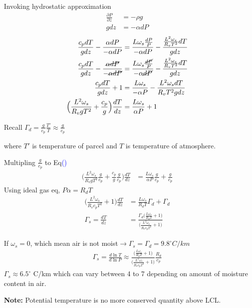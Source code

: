 \documentclass[fleqn,10pt]{SelfArx} %
\newcommand{\myeqref}[1]{\textcolor{blue}{\textup{(\getrefnumber{#1})}}}
\begin{document}
Invoking hydrostatic approximation
\begin{align}
    \frac{\partial P}{\partial z} &= -\rho g \\
    gdz &= -\alpha dP
\end{align}
\begin{align}
    \frac{c_pdT}{gdz} - \frac{\alpha dP}{-\alpha dP} &= \frac{L\omega_s \frac{dP}{P}}{-\alpha dP} - \frac{\frac{L^2\omega_s}{R_vT^2}dT}{gdz} \\
    \frac{c_pdT}{gdz} - \frac{\cancel{\alpha dP}}{-\cancel{\alpha dP}} &= \frac{L\omega_s \frac{\cancel{dP}}{P}}{-\alpha \cancel{dP}} - \frac{\frac{L^2\omega_s}{R_vT^2}dT}{gdz} \\
    \frac{c_pdT}{gdz} + 1 &= \frac{L\omega_s}{-\alpha P} - \frac{L^2\omega_sdT}{R_v T^2 gdz}\\
    \Big(\frac{L^2\omega_s}{R_v g T^2} + \frac{c_p}{g}\Big)\frac{dT}{dz} &= \frac{L\omega_s}{\alpha P} +1 \label{eq:lapse_rate}
\end{align}

Recall $\Gamma_d=\frac{g}{c_p}\frac{T'}{T} \approx \frac{g}{c_p}$

where $T'$ is temperature of parcel and $T$ is temperature of atmosphere.

Multipling $\frac{g}{c_p}$ to Eq\myeqref{eq:lapse_rate}
\begin{align}
    \Big(\frac{L^2\omega_s}{R_v g T^2}\frac{g}{c_p} + \frac{c_p}{g}\frac{g}{c_p} \Big)\frac{dT}{dz} &= \frac{L\omega_s}{\alpha P}\frac{g}{c_p} + \frac{g}{c_p}
\end{align}
Using ideal gas eq, $P\alpha = R_dT$
\begin{align}
    \Big(\frac{L^2\omega_s}{R_v c_p T^2} + 1\Big)\frac{dT}{dz} &= \frac{L\omega_s}{R_d T}\Gamma_d + \Gamma_d \\
   \Gamma_s = \frac{dT}{dz} &= \frac{\Gamma_d \Big(\frac{L\omega_s}{R_d T} + 1\Big)}{\Big(\frac{L^2\omega_s}{R_v c_p T^2} + 1\Big)}
\end{align}

If $\omega_s=0$, which mean air is not moist$\rightarrow$$\Gamma_s=\Gamma_d=9.8^\circ C/km$
\begin{align}
    \Gamma_s = \frac{d\ln T}{d\ln P} \approx \frac{\Big(\frac{L\omega_s}{R_dT} + 1\Big)}{\Big(\frac{L^2\omega_s}{R_v c_p T^2} + 1\Big)}\frac{R_d}{c_p}
\end{align}
$\Gamma_s \approx 6.5^\circ$ C/km which can vary between 4 to 7 depending on amount of moisture content in air.

\textbf{Note:} Potential temperature is no more conserved quantity above LCL. 
\end{document}

